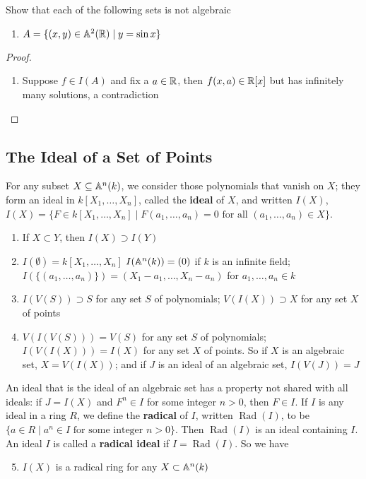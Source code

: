 \documentclass[11pt]{article}
\DeclareMathOperator{\Rad}{\text{Rad}}
\begin{document}
\begin{exercise}
\label{ex1.13}
Show that each of the following sets is not algebraic
\begin{enumerate}
\item \(A=\{(x,y)\in\mathbb{A}^2(\mathbb{R})\mid y=\sin x\}\)
\end{enumerate}
\end{exercise}

\begin{proof}
\begin{enumerate}
\item Suppose \(f\in I(A)\) and fix a \(a\in\mathbb{R}\), then \(f(x,a)\in\mathbb{R}[x]\) but has infinitely many
solutions, a contradiction
\end{enumerate}
\end{proof}
\subsection{The Ideal of a Set of Points}
\label{sec:org421bccd}
For any subset \(X\subseteq\mathbb{A}^n(k)\), we consider those polynomials that vanish on \(X\); they form an
ideal in \(k[X_1,\dots,X_n]\), called the \textbf{ideal} of \(X\), and
written \(I(X)\), \(I(X)=\{F\in k[X_1,\dots,X_n]\mid F(a_1,\dots,a_n)=0\text{ for all }(a_1,\dots,a_n)\in X\}\).
\begin{enumerate}
\item If \(X\subset Y\), then \(I(X)\supset I(Y)\)
\item \(I(\emptyset)=k[X_1,\dots,X_n]\) \(I(\mathbb{A}^n(k))=(0)\) if \(k\) is an infinite
field; \(I(\{(a_1,\dots,a_n)\})=(X_1-a_1,\dots,X_n-a_n)\) for \(a_1,\dots,a_n\in k\)
\item \(I(V(S))\supset S\) for any set \(S\) of polynomials; \(V(I(X))\supset X\) for any set \(X\) of points
\item \(V(I(V(S)))=V(S)\) for any set \(S\) of polynomials; \(I(V(I(X)))=I(X)\) for any set \(X\)
of points. So if \(X\) is an algebraic set, \(X=V(I(X))\); and if \(J\) is an ideal of an
algebraic set, \(I(V(J))=J\)
\end{enumerate}


An ideal that is the ideal of an algebraic set has a property not shared with all ideals:
if \(J=I(X)\) and \(F^n\in I\) for some integer \(n>0\), then \(F\in I\). If \(I\) is any ideal in a
ring \(R\), we define the \textbf{radical} of \(I\), written \(\Rad(I)\), to
be \(\{a\in R\mid a^n\in I\text{ for some integer }n>0\}\). Then \(\Rad(I)\) is an ideal containing \(I\).
An ideal \(I\) is called a \textbf{radical ideal} if \(I=\Rad(I)\). So we have
\begin{enumerate}
\setcounter{enumi}{4}
\item \(I(X)\) is a radical ring for any \(X\subset\mathbb{A}^n(k)\)
\end{enumerate}
\end{document}
